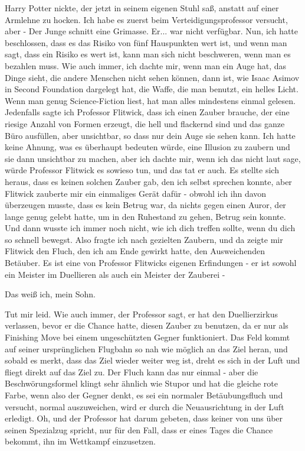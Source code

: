 Harry Potter nickte, der jetzt in seinem eigenen Stuhl saß, anstatt auf einer
Armlehne zu hocken. \glqq Ich habe es zuerst beim Verteidigungsprofessor
versucht, aber -\grqq{} Der Junge schnitt eine Grimasse. \glqq Er... war nicht
verfügbar. Nun, ich hatte beschlossen, dass es das Risiko von fünf Hauspunkten
wert ist, und wenn man sagt, dass ein Risiko es wert ist, kann man sich nicht
beschweren, wenn man es bezahlen muss. Wie auch immer, ich dachte mir, wenn man
ein Auge hat, das Dinge sieht, die andere Menschen nicht sehen können, dann ist,
wie Isaac Asimov in \glqq Second Foundation\grqq{} dargelegt hat, die Waffe, die
man benutzt, ein helles Licht. Wenn man genug Science-Fiction liest, hat man
alles mindestens einmal gelesen. Jedenfalls sagte ich Professor Flitwick, dass
ich einen Zauber brauche, der eine riesige Anzahl von Formen erzeugt, die hell
und flackernd sind und das ganze Büro ausfüllen, aber unsichtbar, so dass nur
dein Auge sie sehen kann. Ich hatte keine Ahnung, was es überhaupt bedeuten
würde, eine Illusion zu zaubern und sie dann unsichtbar zu machen, aber ich
dachte mir, wenn ich das nicht laut sage, würde Professor Flitwick es sowieso
tun, und das tat er auch. Es stellte sich heraus, dass es keinen solchen Zauber
gab, den ich selbst sprechen konnte, aber Flitwick zauberte mir ein einmaliges
Gerät dafür - obwohl ich ihn davon überzeugen musste, dass es kein Betrug war,
da nichts gegen einen Auror, der lange genug gelebt hatte, um in den Ruhestand
zu gehen, Betrug sein konnte. Und dann wusste ich immer noch nicht, wie ich dich
treffen sollte, wenn du dich so schnell bewegst. Also fragte ich nach gezielten
Zaubern, und da zeigte mir Flitwick den Fluch, den ich am Ende gewirkt hatte,
den \glqq Ausweichenden Betäuber\grqq{}. Es ist eine von Professor Flitwicks
eigenen Erfindungen - er ist sowohl ein Meister im Duellieren als auch ein
Meister der Zauberei -\grqq{}

\glqq Das weiß ich, mein Sohn.\grqq{}

\glqq Tut mir leid. Wie auch immer, der Professor sagt, er hat den
Duellierzirkus verlassen, bevor er die Chance hatte, diesen Zauber zu benutzen,
da er nur als Finishing Move bei einem ungeschützten Gegner funktioniert. Das
Feld kommt auf seiner ursprünglichen Flugbahn so nah wie möglich an das Ziel
heran, und sobald es merkt, dass das Ziel wieder weiter weg ist, dreht es sich
in der Luft und fliegt direkt auf das Ziel zu. Der Fluch kann das nur einmal -
aber die Beschwörungsformel klingt sehr ähnlich wie \glqq Stupor\grqq{} und hat
die gleiche rote Farbe, wenn also der Gegner denkt, es sei ein normaler
Betäubungsfluch und versucht, normal auszuweichen, wird er durch die
Neuausrichtung in der Luft erledigt. Oh, und der Professor hat darum gebeten,
dass keiner von uns über seinen Spezialzug spricht, nur für den Fall, dass er
eines Tages die Chance bekommt, ihn im Wettkampf einzusetzen.\grqq{}

